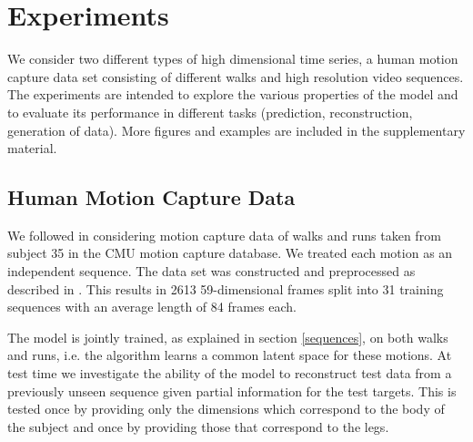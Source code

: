 \documentclass{article} %
\begin{document}
\section{Experiments}

We consider two different types of high dimensional time series, a
human motion capture data set consisting of different walks and high
resolution video sequences. The experiments are intended to explore
the various properties of the model and to evaluate its performance in
different tasks (prediction, reconstruction, generation of data). More
figures and examples are included in the supplementary material.

\subsection{Human Motion Capture Data}

We followed \cite{Taylor,gplvmLarger} in considering motion capture
data of walks and runs taken from subject 35 in the CMU motion capture
database. We treated each motion as an independent sequence.  The data
set was constructed and preprocessed as described in
\cite{gplvmLarger}. This results in 2613 59-dimensional frames split
into 31 training sequences with an average length of 84 frames each.

The model is jointly trained, as explained in section \ref{sequences},
on both walks and runs, i.e. the algorithm learns a common latent
space for these motions. At test time we investigate the ability of
the model to reconstruct test data from a previously unseen sequence
given partial information for the test targets. This is tested once by
providing only the dimensions which correspond to the body of the
subject and once by providing those that correspond to the legs.
%
%
\end{document}
